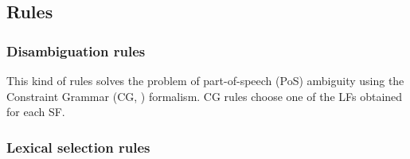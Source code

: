 \documentclass[11pt]{article}
\begin{document}
\subsection{Rules}

\subsubsection{Disambiguation rules}

This kind of rules solves the problem of part-of-speech (PoS) ambiguity using the  Constraint Grammar (CG, \cite{karlsson95}) formalism. CG rules choose one of the LFs obtained for each SF. %

\subsubsection{Lexical selection rules }
\end{document}
